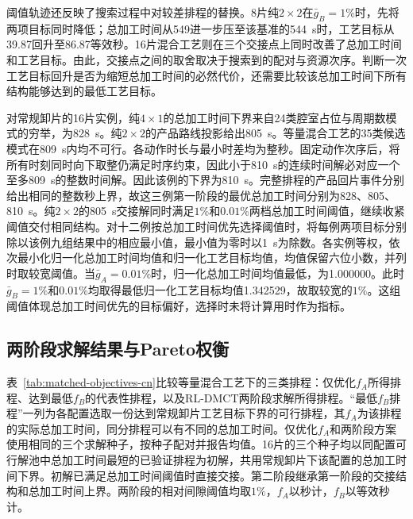 \documentclass[preprint,12pt,nonatbib]{elsarticle}
\begin{document}
阈值轨迹还反映了搜索过程中对较差排程的替换。8片纯$2\times2$在$\bar g_B=1\%$时，先将两项目标同时降低；总加工时间从549进一步压至该基准的544~s时，工艺目标从39.87回升至86.87等效秒。16片混合工艺则在三个交接点上同时改善了总加工时间和工艺目标。由此，交接点之间的取舍取决于搜索到的配对与资源次序。判断一次工艺目标回升是否为缩短总加工时间的必然代价，还需要比较该总加工时间下所有结构能够达到的最低工艺目标。

对常规卸片的16片实例，纯$4\times1$的总加工时间下界来自24类腔室占位与周期数模式的穷举，为828~s。纯$2\times2$的产品路线投影给出805~s。等量混合工艺的35类候选模式在809~s内均不可行。各动作时长与最小时差均为整秒。固定动作次序后，将所有时刻同时向下取整仍满足时序约束，因此小于810~s的连续时间解必对应一个至多809~s的整数时间解。因此该例的下界为810~s。完整排程的产品回片事件分别给出相同的整数秒上界，故这三例第一阶段的最优总加工时间分别为828、805、810~s。纯$2\times2$的805~s交接解同时满足$1\%$和$0.01\%$两档总加工时间阈值，继续收紧阈值交付相同结构。对十二例按总加工时间优先选择阈值时，将每例两项目标分别除以该例九组结果中的相应最小值，最小值为零时以1~s为除数。各实例等权，依次最小化归一化总加工时间均值和归一化工艺目标均值，均值保留六位小数，并列时取较宽阈值。当$\bar g_A=0.01\%$时，归一化总加工时间均值最低，为1.000000。此时$\bar g_B=1\%$和$0.01\%$均取得最低归一化工艺目标均值1.342529，故取较宽的$1\%$。这组阈值体现总加工时间优先的目标偏好，选择时未将计算用时作为指标。

\FloatBarrier
\subsection{两阶段求解结果与Pareto权衡}
\label{sec:stage2-validation-cn}

表~\ref{tab:matched-objectives-cn}比较等量混合工艺下的三类排程：仅优化$f_A$所得排程、达到最低$f_B$的代表性排程，以及RL-DMCT两阶段求解所得排程。“最低$f_B$排程”一列为各配置选取一份达到常规卸片工艺目标下界的可行排程，其$f_A$为该排程的实际总加工时间，同分排程可以有不同的总加工时间。仅优化$f_A$和两阶段方案使用相同的三个求解种子，按种子配对并报告均值。16片的三个种子均以同配置可行解池中总加工时间最短的已验证排程为初解，共用常规卸片下该配置的总加工时间下界。初解已满足总加工时间阈值时直接交接。第二阶段继承第一阶段的交接结构和总加工时间上界。两阶段的相对间隙阈值均取$1\%$，$f_A$以秒计，$f_B$以等效秒计。
\end{document}
